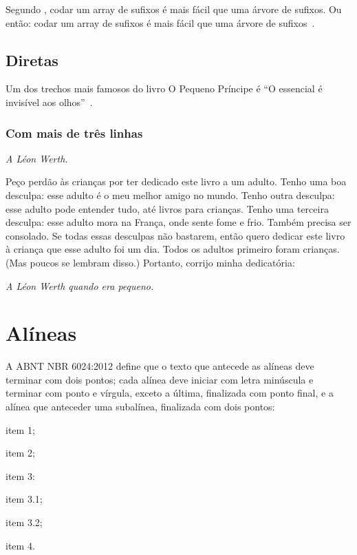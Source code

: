 \documentclass[serif, english, brazilian]{uffstex}
\begin{document}
Segundo \textcite{halim3rd}, codar um array de sufixos é mais fácil que uma árvore de sufixos. Ou então: codar um array de sufixos é mais fácil que uma árvore de sufixos~\cite[253]{halim3rd}.

\section{Diretas}

Um dos trechos mais famosos do livro O Pequeno Príncipe é \enquote{O essencial é invisível aos olhos}~\cite[58]{exupery15}.

\subsection{Com mais de três linhas}

\begin{citacao}
\textit{A Léon Werth.}

Peço perdão às crianças por ter dedicado este livro a um adulto. Tenho uma boa desculpa: esse adulto é o meu melhor amigo no mundo. Tenho outra desculpa: esse adulto pode entender tudo, até livros para crianças. Tenho uma terceira desculpa: esse adulto mora na França, onde sente fome e frio. Também precisa ser consolado. Se todas essas desculpas não bastarem, então quero dedicar este livro à criança que esse adulto foi um dia. Todos os adultos primeiro foram crianças. (Mas poucos se lembram disso.) Portanto, corrijo minha dedicatória:

\textit{A Léon Werth quando era pequeno.}~\cite{exupery15}
\end{citacao}

\chapter{Alíneas}

A ABNT NBR 6024:2012 define que o texto que antecede as alíneas deve terminar com dois pontos; cada alínea deve iniciar com letra minúscula e terminar com ponto e vírgula, exceto a última, finalizada com ponto final, e a alínea que anteceder uma subalínea, finalizada com dois pontos:

\begin{alineas}
  \item item 1;
  \item item 2;
  \item item 3:
  \begin{alineas} %
    \item item 3.1;
    \item item 3.2;
  \end{alineas}
  \item item 4.
\end{alineas}
\end{document}
